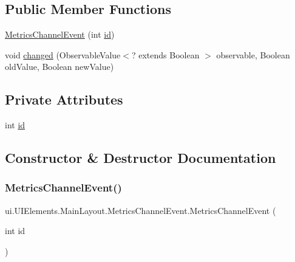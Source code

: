 \subsection*{Public Member Functions}
\begin{DoxyCompactItemize}
\item 
\mbox{\hyperlink{classui_1_1_u_i_elements_1_1_main_layout_1_1_metrics_channel_event_a9a140eb363ac56983f19d64a08c6f5d8}{Metrics\+Channel\+Event}} (int \mbox{\hyperlink{classui_1_1_u_i_elements_1_1_main_layout_1_1_metrics_channel_event_a48e57a9ba603b54205a8e2e0e5f56dfb}{id}})
\item 
void \mbox{\hyperlink{classui_1_1_u_i_elements_1_1_main_layout_1_1_metrics_channel_event_affff1d066bc335b1d84a97ca7ffd0fae}{changed}} (Observable\+Value$<$? extends Boolean $>$ observable, Boolean old\+Value, Boolean new\+Value)
\end{DoxyCompactItemize}
\subsection*{Private Attributes}
\begin{DoxyCompactItemize}
\item 
int \mbox{\hyperlink{classui_1_1_u_i_elements_1_1_main_layout_1_1_metrics_channel_event_a48e57a9ba603b54205a8e2e0e5f56dfb}{id}}
\end{DoxyCompactItemize}


\subsection{Constructor \& Destructor Documentation}
\mbox{\label{classui_1_1_u_i_elements_1_1_main_layout_1_1_metrics_channel_event_a9a140eb363ac56983f19d64a08c6f5d8}} 
\subsubsection{\texorpdfstring{Metrics\+Channel\+Event()}{MetricsChannelEvent()}}
{\footnotesize\ttfamily ui.\+U\+I\+Elements.\+Main\+Layout.\+Metrics\+Channel\+Event.\+Metrics\+Channel\+Event (\begin{DoxyParamCaption}\item[{int}]{id }\end{DoxyParamCaption})\hspace{0.3cm}{\ttfamily [inline]}}



